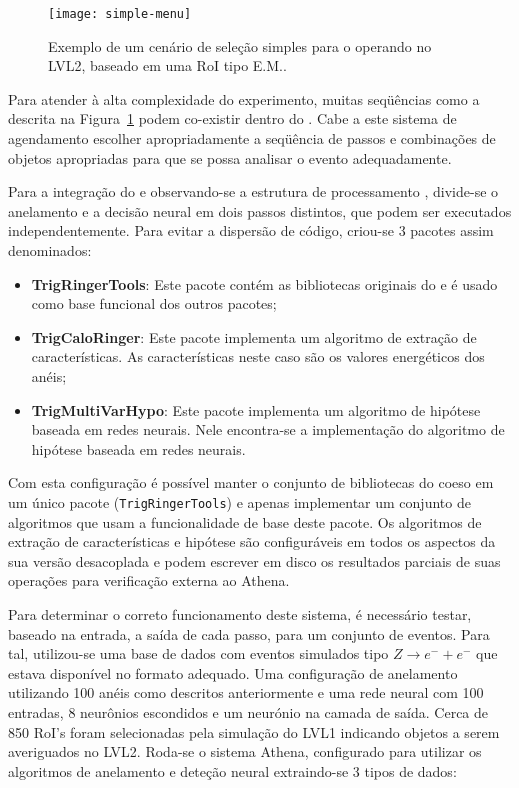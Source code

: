 \begin{figure}
\begin{center}
\texttt{[image: simple-menu]}
\end{center}
\caption{Exemplo de um cenário de seleção simples para o 
operando no LVL2, baseado em uma RoI tipo E.M..}
\label{fig:simple-menu}
\end{figure}

Para atender à alta complexidade do experimento, muitas seqüências como a
descrita na Figura~\ref{fig:simple-menu} podem co-existir dentro do
. Cabe a este sistema de agendamento escolher apropriadamente
a seqüência de passos e combinações de objetos apropriadas para que se possa
analisar o evento adequadamente.

Para a integração do  e observando-se a estrutura de
processamento , divide-se o anelamento e a decisão neural em dois
passos distintos, que podem ser executados independentemente. Para evitar a
dispersão de código, criou-se 3 pacotes assim denominados:

\begin{itemize}
\item \textbf{TrigRingerTools}: Este pacote contém as bibliotecas 
originais do  e é usado como base funcional dos outros
pacotes;
\item \textbf{TrigCaloRinger}: Este pacote implementa um algoritmo de 
extração de características. As características neste caso são os valores
energéticos dos anéis;
\item \textbf{TrigMultiVarHypo}: Este pacote implementa um algoritmo de
hipótese baseada em redes neurais. Nele encontra-se a implementação do
algoritmo de hipótese baseada em redes neurais. 
\end{itemize}

Com esta configuração é possível manter o conjunto de bibliotecas do
 coeso em um único pacote (\texttt{TrigRingerTools}) e
apenas implementar um conjunto de algoritmos que usam a funcionalidade de base
deste pacote. Os algoritmos de extração de características e hipótese são
configuráveis em todos os aspectos da sua versão desacoplada e podem escrever
em disco os resultados parciais de suas operações para verificação externa ao
Athena.

Para determinar o correto funcionamento deste sistema, é necessário testar,
baseado na entrada, a saída de cada passo, para um conjunto de eventos. Para
tal, utilizou-se uma base de dados com eventos simulados tipo $Z \rightarrow
e^- + e^-$ que estava disponível no formato adequado. Uma configuração de
anelamento utilizando 100 anéis como descritos anteriormente e uma rede neural
com 100 entradas, 8 neurônios escondidos e um neurónio na camada de
saída. Cerca de 850 RoI's foram selecionadas pela simulação do LVL1 indicando
objetos a serem averiguados no LVL2. Roda-se o sistema Athena, configurado
para utilizar os algoritmos de anelamento e deteção neural extraindo-se 3
tipos de dados:

